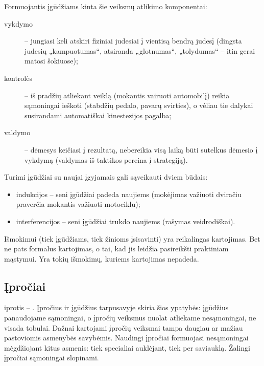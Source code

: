Formuojantis įgūdžiams kinta šie veiksmų atlikimo komponentai:
\begin{description}
  \item[vykdymo] – jungiasi keli atskiri fiziniai judesiai į vientisą 
    bendrą judesį (dingsta judesių „kampuotumas“, atsiranda „glotnumas“, 
    „tolydumas“ – itin gerai matosi šokiuose);
  \item[kontrolės] – iš pradžių atliekant veiklą (mokantis vairuoti 
    automobilį) reikia sąmoningai ieškoti (stabdžių pedalo, pavarų 
    svirties), o vėliau tie dalykai susirandami automatiškai
    kinestezijos pagalba;
  \item[valdymo] – dėmesys keičiasi į rezultatą, nebereikia visą laiką
    būti sutelkus dėmesio į vykdymą (valdymas iš taktikos pereina į
    strategiją).
\end{description}

Turimi įgūdžiai su naujai įgyjamais gali sąveikauti dviem būdais:
\begin{itemize}
  \item indukcijos – seni įgūdžiai padeda naujiems (mokėjimas važiuoti
    dviračiu praverčia mokantis važiuoti motociklu);
  \item interferencijos – seni įgūdžiai trukdo naujiems (rašymas 
    veidrodiškai).
\end{itemize}


Išmokimui (tiek įgūdžiams, tiek žinioms įsisavinti) yra reikalingas 
kartojimas. Bet ne pats formalus kartojimas, o tai, kad jis leidžia
pasireikšti praktiniam mąstymui. Yra tokių išmokimų, kuriems kartojimas
nepadeda.

\subsection{Įpročiai}

\Gls{iprotis} – . Įpročius ir įgūdžius tarpusavyje 
skiria šios ypatybės: įgūdžius panaudojame sąmoningai, o įpročių veiksmus 
nuolat atliekame nesąmoningai, ne visada tobulai. Dažnai kartojami įpročių 
veiksmai tampa daugiau ar mažiau pastoviomis asmenybės savybėmis. Naudingi 
įpročiai formuojasi nesąmoningai mėgdžiojant kitus asmenis: tiek specialiai 
auklėjant, tiek per saviauklą. Žalingi įpročiai sąmoningai slopinami.

